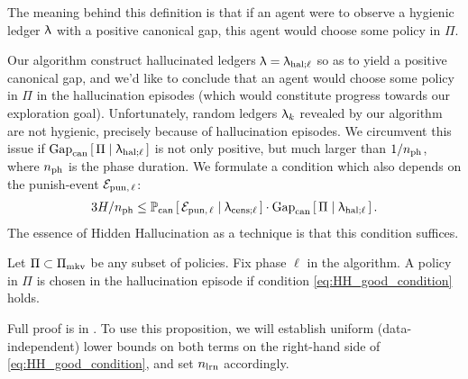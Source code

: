 
The meaning  behind this definition is that if an agent were to observe a hygienic ledger $\uplambda$ with a positive canonical gap, this agent would choose some policy in $\Pi$.

Our algorithm construct hallucinated ledgers $\uplambda = \uplambda_{\mathrm{hal};\ell}$ so as to yield a positive canonical gap, and we'd like to conclude that an agent would choose some policy in $\Pi$ in the hallucination episodes (which would constitute progress towards our exploration goal). Unfortunately, random ledgers $\uplambda_k$ revealed by our algorithm are not hygienic, precisely because of hallucination episodes. We circumvent this issue if
    $\mathrm{Gap}_{\mathrm{can}}\left[\,\Pi \mid \uplambda_{\mathrm{hal};\ell}\,\right]$
is not only positive, but much larger than $1/n_{\mathrm{ph}}$, where $n_{\mathrm{ph}}$ is the phase duration. We formulate a condition which also depends on the punish-event $\mathcal{E}_{\mathrm{pun},\,\ell}$:
\begin{align}\label{eq:HH_good_condition}
3H/n_{\mathrm{ph}} \le \operatorname{\mathbb{P}}_{\mathrm{can}}\left[\,\mathcal{E}_{\mathrm{pun},\,\ell} \mid \uplambda_{\mathrm{cens};\ell}\,\right] \cdot \mathrm{Gap}_{\mathrm{can}}\left[\,\Pi \mid \uplambda_{\mathrm{hal};\ell}\,\right].
\end{align}
The essence of Hidden Hallucination as a technique is that this condition suffices.



\begin{proposition}\label{prop:mdp_hh} Let $\Pi \subset \Pi_{\mathrm{mkv}}$ be any subset of policies. Fix phase $\ell$ in the algorithm. A policy in $\Pi$ is chosen in the hallucination episode if condition \eqref{eq:HH_good_condition} holds.
\end{proposition}

Full proof is in . To use this proposition, we will establish uniform (\ie data-independent) lower bounds on both terms on the right-hand side of \eqref{eq:HH_good_condition}, and set $n_{\mathrm{lrn}}$ accordingly.

